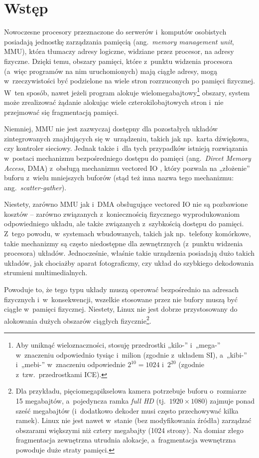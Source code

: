 \chapter{Wstęp}

Nowoczesne procesory przeznaczone do serwerów i~komputów osobistych
posiadają jednostkę zarządzania pamięcią (ang.\ {\it memory management
  unit}, MMU), która tłumaczy adresy logiczne, widziane przez
procesor, na adresy fizyczne.  Dzięki temu, obszary pamięci, które
z~punktu widzenia procesora (a~więc programów na nim uruchomionych)
mają ciągłe adresy, mogą w~rzeczywistości być podzielone na wiele
stron rozrzuconych po pamięci fizycznej.  W~ten sposób, nawet jeżeli
program alokuje wielomegabajtowy\footnote{Aby uniknąć wieloznaczności,
  stosuję przedrostki „kilo-” i~„mega-” w~znaczeniu odpowiednio tysiąc
  i~milion (zgodnie z~układem SI), a~„kibi-” i~„mebi-” w~znaczeniu
  odpowiednie $2^{10} = 1024$ i~$2^{20}$ (zgodnie
  z~tzw.\ przedrostkami ICE).} obszary, system może zrealizować żądanie
alokując wiele czterokilobajtowych stron i~nie przejmować się
fragmentacją pamięci.

Niemniej, MMU nie jest zazwyczaj dostępny dla pozostałych układów
zintegrowanych znajdujących się w~urządzeniu, takich jak np.\ karta
dźwiękowa, czy kontroler sieciowy.  Jednak także i~dla tych przypadków
istnieją rozwiązania w~postaci mechanizmu bezpośredniego dostępu do
pamięci (ang.\ {\it Dircet Memory Access}, DMA) z~obsługą mechanizmu
vectored IO , który pozwala na „złożenie” buforu
z~wielu mniejszych buforów (stąd też inna nazwa tego mechanizmu:
ang.\ {\it scatter-gather}).

Niestety, zarówno MMU jak i~DMA obsługujące vectored IO
 nie są pozbawione kosztów -- zarówno związanych
z~koniecznością fizycznego wyprodukowaniom odpowiedniego układu, ale
także związanych z~szybkością dostępu do pamięci.  Z~tego powodu,
w~systemach wbudowanych, takich jak np.\ telefony komórkowe, takie
mechanizmy są często niedostępne dla zewnętrznych (z~punktu widzenia
procesora) układów.  Jednocześnie, właśnie takie urządzenia posiadają
dużo takich układów, jak chociażby aparat fotograficzny, czy układ do
szybkiego dekodowania strumieni multimedialnych.

Powoduje to, że tego typu układy muszą operować bezpośrednio na
adresach fizycznych i~w~konsekwencji, wszelkie stosowane przez nie
bufory muszą być ciągłe w~pamięci fizycznej.  Niestety, Linux nie jest
dobrze przystosowany do alokowania dużych obszarów ciągłych
fizycznie\footnote{Dla przykładu,
  pięciomegapikselowa kamera potrzebuje buforu o~rozmiarze 15
  megabajtów, a~pojedyncza ramka {\it full HD} (tj.\ $1920 \times
  1080$) zajmuje ponad sześć megabajtów (i~dodatkowo dekoder musi
  często przechowywać kilka ramek).  Linux nie jest nawet w~stanie
  (bez modyfikowania źródła) zarządzać obszarami większymi niż cztery
  megabajty (1024 strony).  Na domiar złego fragmentacja zewnętrzna
  utrudnia alokacje, a~fragmentacja wewnętrzna powoduje duże straty
  pamięci.}.

